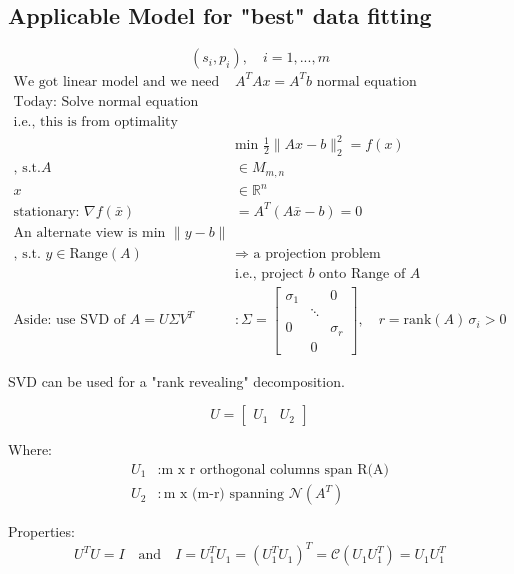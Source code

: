 \begin{problem}
  \section*{Applicable Model for "best" data fitting}
  \[ (s_i, p_i), \quad i = 1,...,m \]
  \begin{align*}
  \text{We got linear model and we need to solve } & A^T A x = A^T b \text{ normal equation} \\
  \text{Today: Solve normal equation (whenever case)} \\
  \text{i.e., this is from optimality condition for } \\ 
  & \text{min } \frac{1}{2}\|Ax-b\|_2^2 = f(x) \\ \text{, s.t.} 
  A & \in M_{m,n} \\
  x & \in \mathbb{R}^n \\
  \text{stationary: } \nabla f(\bar{x}) & = A^T(A\bar{x}-b) = 0 \\
  \text{An alternate view is min } \|y-b\| & \\ \text{, s.t. } y \in \text{Range}(A) 
  & \Rightarrow \text{ a projection problem} \\
  & \text{i.e., project } b \text{ onto Range of } A \\
  \text{Aside: use SVD of } A=U\Sigma V^T & : \Sigma = \begin{bmatrix}
  \sigma_1 & & 0 \\
  & \ddots & \\
  0 & & \sigma_r \\
  & 0 &
  \end{bmatrix}, \quad r = \text{rank}(A)\, \sigma_i >0
  \end{align*}
  
  
  
  
  
  SVD can be used for a "rank revealing" decomposition.
  
  \[
  U = \begin{bmatrix} U_1 & U_2 \end{bmatrix}
  \]
  
  Where:
  \begin{align*}
  U_1 & : \text{m x r orthogonal columns span R(A)} \\
  U_2 & : \text{m x (m-r) spanning } \mathcal{N}(A^T)
  \end{align*}
  
  Properties:
  \[
  U^TU = I \quad \text{and} \quad I= U_1^TU_1 =( U_1^TU_1)^T = \mathcal{C}(U_1U_1^T) = U_1U_1^T
  \]
  

\end{problem}

